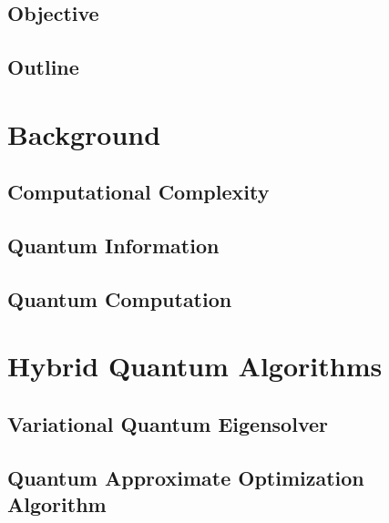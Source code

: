 \documentclass[a4paper,10pt]{report}
\begin{document}
\section{Objective}
\lipsum[1]
\section{Outline}
\lipsum[1]

\chapter{Background}
\lipsum[1]
\section{Computational Complexity}
\lipsum[1]
\section{Quantum Information}
\lipsum[1]
\section{Quantum Computation}
\lipsum[1]

\chapter{Hybrid Quantum Algorithms}
\section{Variational Quantum Eigensolver}
\lipsum[1]
\section{Quantum Approximate Optimization Algorithm}
\lipsum[1]
\end{document}
